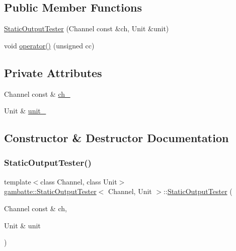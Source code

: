 \subsection*{Public Member Functions}
\begin{DoxyCompactItemize}
\item 
\hyperlink{classgambatte_1_1StaticOutputTester_a598aaf698216da66440ebc9922cc3b77}{Static\+Output\+Tester} (Channel const \&ch, Unit \&unit)
\item 
void \hyperlink{classgambatte_1_1StaticOutputTester_a133c2bb69dd470d954954d4518dcdd4c}{operator()} (unsigned cc)
\end{DoxyCompactItemize}
\subsection*{Private Attributes}
\begin{DoxyCompactItemize}
\item 
Channel const  \& \hyperlink{classgambatte_1_1StaticOutputTester_a8c8666e9c317a775779c40bc2f7dda5d}{ch\+\_\+}
\item 
Unit \& \hyperlink{classgambatte_1_1StaticOutputTester_a23bbc293070a93e9b1d1071590ffb936}{unit\+\_\+}
\end{DoxyCompactItemize}


\subsection{Constructor \& Destructor Documentation}
\mbox{\label{classgambatte_1_1StaticOutputTester_a598aaf698216da66440ebc9922cc3b77}} 
\subsubsection{\texorpdfstring{Static\+Output\+Tester()}{StaticOutputTester()}}
{\footnotesize\ttfamily template$<$class Channel, class Unit$>$ \\
\hyperlink{classgambatte_1_1StaticOutputTester}{gambatte\+::\+Static\+Output\+Tester}$<$ Channel, Unit $>$\+::\hyperlink{classgambatte_1_1StaticOutputTester}{Static\+Output\+Tester} (\begin{DoxyParamCaption}\item[{Channel const \&}]{ch,  }\item[{Unit \&}]{unit }\end{DoxyParamCaption})\hspace{0.3cm}{\ttfamily [inline]}}



